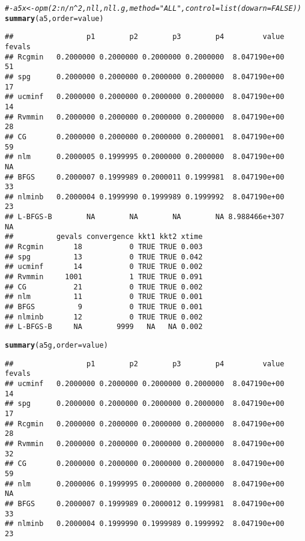 \documentclass[11pt]{article}\usepackage[]{graphicx}\usepackage[]{color}
\makeatletter
\newcommand{\hlcom}[1]{\textcolor[rgb]{0.678,0.584,0.686}{\textit{#1}}}%
\newcommand{\hlstd}[1]{\textcolor[rgb]{0.345,0.345,0.345}{#1}}%
\newcommand{\hlkwc}[1]{\textcolor[rgb]{0.333,0.667,0.333}{#1}}%
\newcommand{\hlkwd}[1]{\textcolor[rgb]{0.737,0.353,0.396}{\textbf{#1}}}%
\newenvironment{kframe}{%
 \def\at@end@of@kframe{}%
 \ifinner\ifhmode%
  \def\at@end@of@kframe{\end{minipage}}%
  \begin{minipage}{\columnwidth}%
 \fi\fi%
 \def\FrameCommand##1{\hskip\@totalleftmargin \hskip-\fboxsep
 \colorbox{shadecolor}{##1}\hskip-\fboxsep
     \hskip-\linewidth \hskip-\@totalleftmargin \hskip\columnwidth}%
 \MakeFramed {\advance\hsize-\width
   \@totalleftmargin\z@ \linewidth\hsize
   \@setminipage}}%
 {\par\unskip\endMakeFramed%
 \at@end@of@kframe}
\newenvironment{knitrout}{}{} %
\makeatother
\begin{document}
\begin{knitrout}
\begin{kframe}
{\ttfamily\noindent\color{warningcolor}{\#\# Warning in optimr(par, fn, gr, method = meth, lower = lower, upper = upper, : optimr: optim() with bounds ONLY uses L-BFGS-B}}\begin{alltt}
\hlcom{#- a5x <- opm(2:n/n^2, nll, nll.g, method="ALL", control=list(dowarn=FALSE))}
\hlkwd{summary}\hlstd{(a5,}\hlkwc{order}\hlstd{=value)}
\end{alltt}
\begin{verbatim}
##                 p1        p2        p3        p4         value fevals
## Rcgmin   0.2000000 0.2000000 0.2000000 0.2000000  8.047190e+00     51
## spg      0.2000000 0.2000000 0.2000000 0.2000000  8.047190e+00     17
## ucminf   0.2000000 0.2000000 0.2000000 0.2000000  8.047190e+00     14
## Rvmmin   0.2000000 0.2000000 0.2000000 0.2000000  8.047190e+00     28
## CG       0.2000000 0.2000000 0.2000000 0.2000001  8.047190e+00     59
## nlm      0.2000005 0.1999995 0.2000000 0.2000000  8.047190e+00     NA
## BFGS     0.2000007 0.1999989 0.2000011 0.1999981  8.047190e+00     33
## nlminb   0.2000004 0.1999990 0.1999989 0.1999992  8.047190e+00     23
## L-BFGS-B        NA        NA        NA        NA 8.988466e+307     NA
##          gevals convergence kkt1 kkt2 xtime
## Rcgmin       18           0 TRUE TRUE 0.003
## spg          13           0 TRUE TRUE 0.042
## ucminf       14           0 TRUE TRUE 0.002
## Rvmmin     1001           1 TRUE TRUE 0.091
## CG           21           0 TRUE TRUE 0.002
## nlm          11           0 TRUE TRUE 0.001
## BFGS          9           0 TRUE TRUE 0.001
## nlminb       12           0 TRUE TRUE 0.002
## L-BFGS-B     NA        9999   NA   NA 0.002
\end{verbatim}
\begin{alltt}
\hlkwd{summary}\hlstd{(a5g,}\hlkwc{order}\hlstd{=value)}
\end{alltt}
\begin{verbatim}
##                 p1        p2        p3        p4         value fevals
## ucminf   0.2000000 0.2000000 0.2000000 0.2000000  8.047190e+00     14
## spg      0.2000000 0.2000000 0.2000000 0.2000000  8.047190e+00     17
## Rcgmin   0.2000000 0.2000000 0.2000000 0.2000000  8.047190e+00     28
## Rvmmin   0.2000000 0.2000000 0.2000000 0.2000000  8.047190e+00     32
## CG       0.2000000 0.2000000 0.2000000 0.2000000  8.047190e+00     59
## nlm      0.2000006 0.1999995 0.2000000 0.2000000  8.047190e+00     NA
## BFGS     0.2000007 0.1999989 0.2000012 0.1999981  8.047190e+00     33
## nlminb   0.2000004 0.1999990 0.1999989 0.1999992  8.047190e+00     23

\end{verbatim}
\end{kframe}
\end{knitrout}
\end{document}
